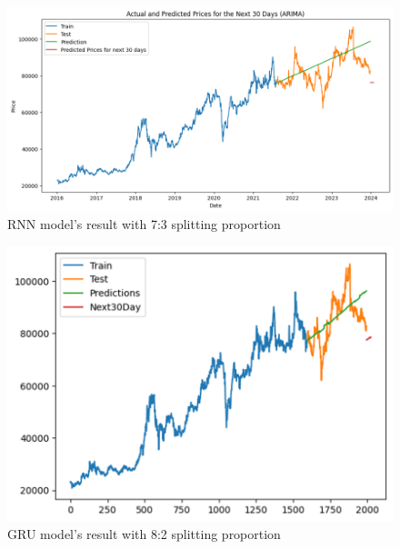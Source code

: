 \documentclass{ieeeojies}
\begin{document}
\begin{figure}[H]
  \centering
  \begin{minipage}{0.8\linewidth}
    \centering
    \includegraphics[width=\linewidth]{bibliography/SARIMA_VCB73.png}
    \caption{RNN model's result with 7:3 splitting proportion}
    \label{fig12}
  \end{minipage}
\end{figure}
\begin{figure}[H]
  \centering
  \begin{minipage}{0.8\linewidth}
    \centering
    \includegraphics[width=\linewidth]{bibliography/DLM_VCB82.png}
    \caption{GRU model's result with 8:2 splitting proportion}
    \label{fig13}
  \end{minipage}
\end{figure}
\end{document}
